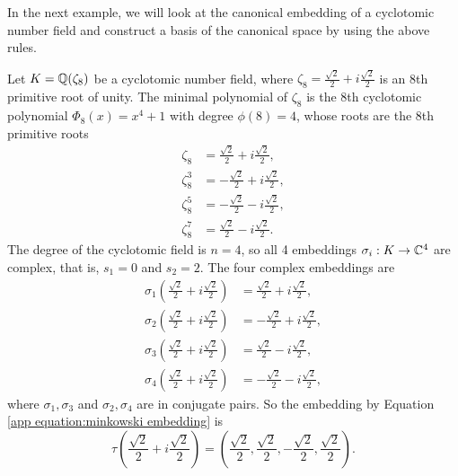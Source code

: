 \documentclass[../main.tex]{subfiles}
\begin{document}
In the next example, we will look at the canonical embedding of a cyclotomic number field and construct a basis of the canonical space by using the above rules. 
\begin{example}
Let  $K=\mathbb{Q}(\zeta_8)$ be a cyclotomic number field, where $\zeta_8 = \frac{\sqrt{2}}{2}+ i \frac{\sqrt{2}}{2}$ is an 8th primitive root of unity. The minimal polynomial of $\zeta_8$ is the 8th cyclotomic polynomial $\Phi_8(x) = x^4+1$ with degree $\phi(8)=4$, whose roots are the 8th primitive roots
\begin{align*}
\zeta_8 &= \frac{\sqrt{2}}{2}+ i \frac{\sqrt{2}}{2}, \\
\zeta_8^3 &= -\frac{\sqrt{2}}{2}+ i \frac{\sqrt{2}}{2},\\
\zeta_8^5 &= -\frac{\sqrt{2}}{2}- i \frac{\sqrt{2}}{2}, \\
\zeta_8^7 &= \frac{\sqrt{2}}{2}- i \frac{\sqrt{2}}{2}.
\end{align*}
The degree of the cyclotomic field is $n=4$, so all 4 embeddings $\sigma_i: K \rightarrow \mathbb{C}^4$ are complex, that is, $s_1=0$ and $s_2=2$. The four complex embeddings are 
\begin{align*}
    \sigma_1\left(\frac{\sqrt{2}}{2}+ i \frac{\sqrt{2}}{2}\right) &= \frac{\sqrt{2}}{2}+ i \frac{\sqrt{2}}{2}, \\
    \sigma_2\left(\frac{\sqrt{2}}{2}+ i \frac{\sqrt{2}}{2}\right) &= -\frac{\sqrt{2}}{2}+ i \frac{\sqrt{2}}{2}, \\
    \sigma_3\left(\frac{\sqrt{2}}{2}+ i \frac{\sqrt{2}}{2}\right) &= \frac{\sqrt{2}}{2}- i \frac{\sqrt{2}}{2}, \\
    \sigma_4\left(\frac{\sqrt{2}}{2}+ i \frac{\sqrt{2}}{2}\right) &= -\frac{\sqrt{2}}{2}- i \frac{\sqrt{2}}{2}, 
\end{align*}
where $\sigma_1,\sigma_3$ and $\sigma_2,\sigma_4$ are in conjugate pairs. So the embedding by Equation \ref{app equation:minkowski embedding} is 
\begin{equation*}
    \tau\left(\frac{\sqrt{2}}{2}+ i \frac{\sqrt{2}}{2}\right)=\left(\frac{\sqrt{2}}{2}, \frac{\sqrt{2}}{2}, -\frac{\sqrt{2}}{2}, \frac{\sqrt{2}}{2} \right).
\end{equation*}


\end{example}
\end{document}
